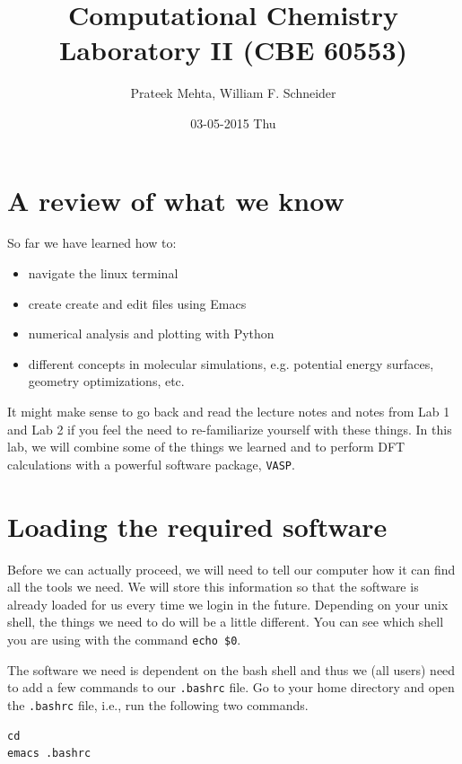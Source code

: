 \documentclass[11pt]{article}
\author{Prateek Mehta, William F. Schneider}
\date{03-05-2015 Thu}
\title{Computational Chemistry Laboratory II (CBE 60553)}
\begin{document}
\maketitle


\section{A review of what we know}
\label{sec-1}

So far we have learned how to:

\begin{itemize}
\item navigate the linux terminal

\item create create and edit files using Emacs

\item numerical analysis and plotting with Python

\item different concepts in molecular simulations, e.g. potential energy surfaces, geometry optimizations, etc.
\end{itemize}

It might make sense to go back and read the lecture notes and notes from Lab 1 and Lab 2 if you feel the need to re-familiarize yourself with these things. In this lab, we will combine some of the things we learned and to perform DFT calculations with a powerful software package, \texttt{VASP}. 


\section{Loading the required software}
\label{sec-2}

Before we can actually proceed, we will need to tell our computer how it can find all the tools we need. We will store this information so that the software is already loaded for us every time we login in the future. Depending on your unix shell, the things we need to do will be a little different. You can see which shell you are using with the command \verb~echo $0~. 

The software we need is dependent on the bash shell and thus we (all users) need to add a few commands to our \verb~.bashrc~ file. Go to your home directory and open the \texttt{.bashrc} file, i.e., run the following two commands. 

\begin{verbatim}
cd
emacs .bashrc
\end{verbatim}
\end{document}
